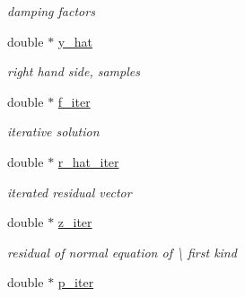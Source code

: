 \begin{DoxyCompactItemize}
\begin{DoxyCompactList}\small\item\em damping factors \end{DoxyCompactList}\item 
\hypertarget{structinfst__adjoint__plan_a52d2b0b0d208e673eada45dff01e9c13}{double $\ast$ \hyperlink{structinfst__adjoint__plan_a52d2b0b0d208e673eada45dff01e9c13}{y\-\_\-hat}}\label{structinfst__adjoint__plan_a52d2b0b0d208e673eada45dff01e9c13}

\begin{DoxyCompactList}\small\item\em right hand side, samples \end{DoxyCompactList}\item 
\hypertarget{structinfst__adjoint__plan_a53b03057778ae78ee06efd6b135e23fb}{double $\ast$ \hyperlink{structinfst__adjoint__plan_a53b03057778ae78ee06efd6b135e23fb}{f\-\_\-iter}}\label{structinfst__adjoint__plan_a53b03057778ae78ee06efd6b135e23fb}

\begin{DoxyCompactList}\small\item\em iterative solution \end{DoxyCompactList}\item 
\hypertarget{structinfst__adjoint__plan_abd086bc019b356986e38f3db8039051f}{double $\ast$ \hyperlink{structinfst__adjoint__plan_abd086bc019b356986e38f3db8039051f}{r\-\_\-hat\-\_\-iter}}\label{structinfst__adjoint__plan_abd086bc019b356986e38f3db8039051f}

\begin{DoxyCompactList}\small\item\em iterated residual vector \end{DoxyCompactList}\item 
\hypertarget{structinfst__adjoint__plan_a254d587d2d91f18fb55a2ccae89198a5}{double $\ast$ \hyperlink{structinfst__adjoint__plan_a254d587d2d91f18fb55a2ccae89198a5}{z\-\_\-iter}}\label{structinfst__adjoint__plan_a254d587d2d91f18fb55a2ccae89198a5}

\begin{DoxyCompactList}\small\item\em residual of normal equation of \textbackslash{} first kind \end{DoxyCompactList}\item 
\hypertarget{structinfst__adjoint__plan_a53b6ba348be2011c1cfecdb9f16829fd}{double $\ast$ \hyperlink{structinfst__adjoint__plan_a53b6ba348be2011c1cfecdb9f16829fd}{p\-\_\-iter}}\label{structinfst__adjoint__plan_a53b6ba348be2011c1cfecdb9f16829fd}


\end{DoxyCompactItemize}
